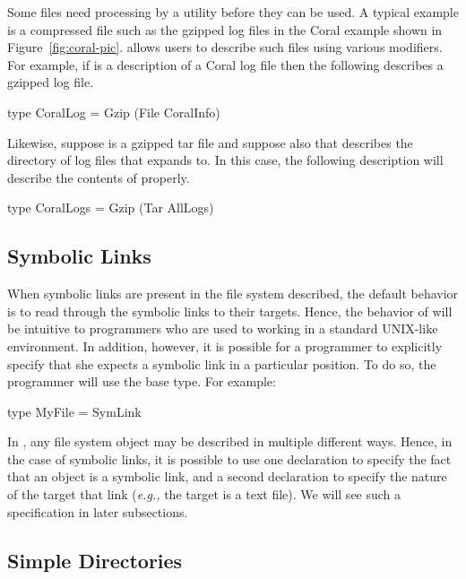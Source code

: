 \documentclass[natbib]{sigplanconf}
\begin{document}
Some files need processing by a utility before they can be used.  A typical
example is a compressed file such as the gzipped log files in the Coral
example shown in Figure~\ref{fig:coral-pic}.  \forest{} allows users to describe such 
files using various modifiers.  For example, if  is a \padshaskell{}
description of a Coral log file then the following describes a gzipped log file.
\begin{code}
type CoralLog = Gzip (File CoralInfo)
\end{code}
Likewise, suppose  is a gzipped tar file and suppose also that 
 describes the directory of log files that  expands
to.  In this case, the following description will describe the contents of
 properly.
\begin{code}
type CoralLogs = Gzip (Tar AllLogs)
\end{code}

\subsection{Symbolic Links}
\label{sec:symlinks}

When symbolic links are present in the file system described,
the default behavior is to read through the symbolic links to their
targets.  Hence, the behavior of \forest{} will be intuitive to programmers who
are used to working in a standard UNIX-like environment.  In addition, however, it is possible
for a programmer to explicitly specify that she expects a symbolic link in a particular
position.  To do so, the programmer will use the  base type.  For
example:
\begin{code}
type MyFile = SymLink
\end{code}
In \forest{}, any file system object may be described in multiple different ways.
Hence, in the case of symbolic links, it is possible to use one declaration to
specify the fact that an object is a symbolic link, and a second declaration to specify
the nature of the target that link ({\em e.g.,} the target is a text file).  We will see such 
a specification in later subsections.

\subsection{Simple Directories}
\label{sec:simple-directories}
\end{document}
